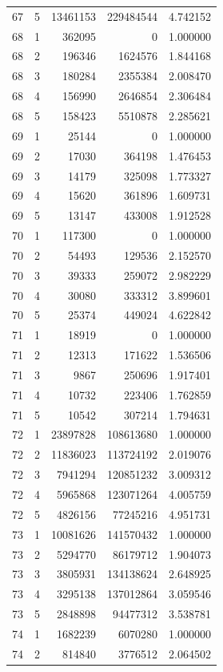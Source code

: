 \begin{longtable}{rrrrr}
67 & 5 & 13461153 & 229484544 & 4.742152 \\
68 & 1 & 362095 & 0 & 1.000000 \\
68 & 2 & 196346 & 1624576 & 1.844168 \\
68 & 3 & 180284 & 2355384 & 2.008470 \\
68 & 4 & 156990 & 2646854 & 2.306484 \\
68 & 5 & 158423 & 5510878 & 2.285621 \\
69 & 1 & 25144 & 0 & 1.000000 \\
69 & 2 & 17030 & 364198 & 1.476453 \\
69 & 3 & 14179 & 325098 & 1.773327 \\
69 & 4 & 15620 & 361896 & 1.609731 \\
69 & 5 & 13147 & 433008 & 1.912528 \\
70 & 1 & 117300 & 0 & 1.000000 \\
70 & 2 & 54493 & 129536 & 2.152570 \\
70 & 3 & 39333 & 259072 & 2.982229 \\
70 & 4 & 30080 & 333312 & 3.899601 \\
70 & 5 & 25374 & 449024 & 4.622842 \\
71 & 1 & 18919 & 0 & 1.000000 \\
71 & 2 & 12313 & 171622 & 1.536506 \\
71 & 3 & 9867 & 250696 & 1.917401 \\
71 & 4 & 10732 & 223406 & 1.762859 \\
71 & 5 & 10542 & 307214 & 1.794631 \\
72 & 1 & 23897828 & 108613680 & 1.000000 \\
72 & 2 & 11836023 & 113724192 & 2.019076 \\
72 & 3 & 7941294 & 120851232 & 3.009312 \\
72 & 4 & 5965868 & 123071264 & 4.005759 \\
72 & 5 & 4826156 & 77245216 & 4.951731 \\
73 & 1 & 10081626 & 141570432 & 1.000000 \\
73 & 2 & 5294770 & 86179712 & 1.904073 \\
73 & 3 & 3805931 & 134138624 & 2.648925 \\
73 & 4 & 3295138 & 137012864 & 3.059546 \\
73 & 5 & 2848898 & 94477312 & 3.538781 \\
74 & 1 & 1682239 & 6070280 & 1.000000 \\
74 & 2 & 814840 & 3776512 & 2.064502 \\

\end{longtable}
